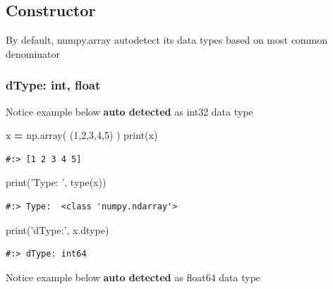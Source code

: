 \documentclass[
]{book}
\newenvironment{Shaded}{\begin{snugshade}}{\end{snugshade}}
\newcommand{\BuiltInTok}[1]{#1}
\newcommand{\DecValTok}[1]{\textcolor[rgb]{0.06,0.06,0.06}{#1}}
\newcommand{\NormalTok}[1]{#1}
\newcommand{\OperatorTok}[1]{\textcolor[rgb]{0.43,0.43,0.43}{\textbf{#1}}}
\newcommand{\StringTok}[1]{\textcolor[rgb]{0.5,0.5,0.5}{#1}}
\begin{document}
\hypertarget{constructor-7}{%
\subsection{Constructor}\label{constructor-7}}

By default, numpy.array autodetect its data types based on most common denominator

\hypertarget{dtype-int-float}{%
\subsubsection{dType: int, float}\label{dtype-int-float}}

Notice example below \textbf{auto detected} as int32 data type

\begin{Shaded}
\begin{Highlighting}[]
\NormalTok{x }\OperatorTok{=}\NormalTok{ np.array( (}\DecValTok{1}\NormalTok{,}\DecValTok{2}\NormalTok{,}\DecValTok{3}\NormalTok{,}\DecValTok{4}\NormalTok{,}\DecValTok{5}\NormalTok{) )}
\BuiltInTok{print}\NormalTok{(x)}
\end{Highlighting}
\end{Shaded}

\begin{verbatim}
#:> [1 2 3 4 5]
\end{verbatim}

\begin{Shaded}
\begin{Highlighting}[]
\BuiltInTok{print}\NormalTok{(}\StringTok{'Type: '}\NormalTok{, }\BuiltInTok{type}\NormalTok{(x))}
\end{Highlighting}
\end{Shaded}

\begin{verbatim}
#:> Type:  <class 'numpy.ndarray'>
\end{verbatim}

\begin{Shaded}
\begin{Highlighting}[]
\BuiltInTok{print}\NormalTok{(}\StringTok{'dType:'}\NormalTok{, x.dtype)}
\end{Highlighting}
\end{Shaded}

\begin{verbatim}
#:> dType: int64
\end{verbatim}

Notice example below \textbf{auto detected} as float64 data type
\end{document}

